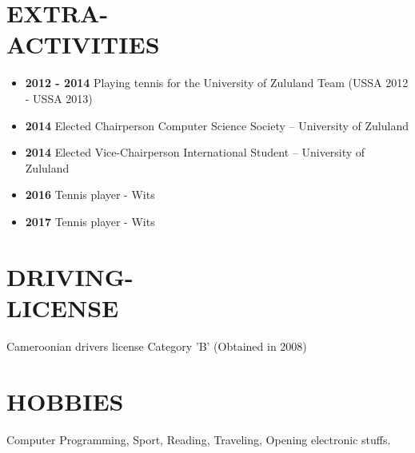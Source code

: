 \documentclass[margin]{res}
\begin{document}
\begin{resume}

\section{EXTRA-\\ACTIVITIES}
\begin{itemize}
\item \textbf{2012 - 2014} Playing tennis for the University of Zululand Team (USSA 2012 - USSA 2013)
\item \textbf{2014} Elected Chairperson Computer Science Society – University of Zululand
\item \textbf{2014} Elected Vice-Chairperson International Student – University of Zululand
\item \textbf{2016} Tennis player - Wits
\item \textbf{2017} Tennis player - Wits
\end{itemize}


\section{DRIVING-\\LICENSE} Cameroonian driver\textsc{}s license Category 'B' (Obtained in 2008)


\section{HOBBIES}
Computer Programming, Sport, Reading, Traveling, Opening electronic stuffs. 
\end{resume}
\end{document}
